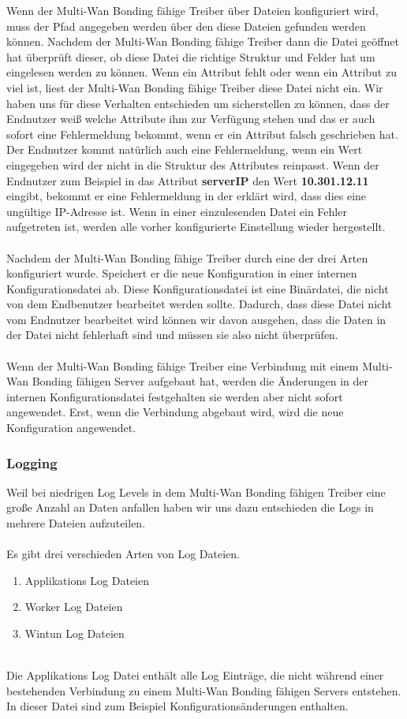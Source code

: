 Wenn der Multi-Wan Bonding fähige Treiber über Dateien konfiguriert wird, muss der Pfad angegeben werden über den diese Dateien gefunden werden können. Nachdem der Multi-Wan Bonding fähige Treiber dann die Datei geöffnet hat überprüft dieser, ob diese Datei die richtige Struktur und Felder hat um eingelesen werden zu können. Wenn ein Attribut fehlt oder wenn ein Attribut zu viel ist, liest der Multi-Wan Bonding fähige Treiber diese Datei nicht ein. Wir haben uns für diese Verhalten entschieden um sicherstellen zu können, dass der Endnutzer weiß welche Attribute ihm zur Verfügung stehen und das er auch sofort eine Fehlermeldung bekommt, wenn er ein Attribut falsch geschrieben hat. Der Endnutzer kommt natürlich auch eine Fehlermeldung, wenn ein Wert eingegeben wird der nicht in die Struktur des Attributes reinpasst. Wenn der Endnutzer zum Beispiel in das Attribut \textbf{serverIP} den Wert \textbf{10.301.12.11} eingibt, bekommt er eine Fehlermeldung in der erklärt wird, dass dies eine ungültige IP-Adresse ist. Wenn in einer einzulesenden Datei ein Fehler aufgetreten ist, werden alle vorher konfigurierte Einstellung wieder hergestellt. 
\\\\
Nachdem der Multi-Wan Bonding fähige Treiber durch eine der drei Arten konfiguriert wurde. Speichert er die neue Konfiguration in einer internen Konfigurationsdatei ab. Diese Konfigurationsdatei ist eine Binärdatei, die nicht von dem Endbenutzer bearbeitet werden sollte. Dadurch, dass diese Datei nicht vom Endnutzer bearbeitet wird können wir davon ausgehen, dass die Daten in der Datei nicht fehlerhaft sind und müssen sie also nicht   überprüfen.
\\\\
Wenn der Multi-Wan Bonding fähige Treiber eine Verbindung mit einem Multi-Wan Bonding fähigen Server aufgebaut hat, werden die Änderungen in der internen Konfigurationsdatei festgehalten sie werden aber nicht sofort angewendet. Erst, wenn die Verbindung abgebaut wird, wird die neue Konfiguration angewendet.
\subsubsection{Logging}
Weil bei niedrigen Log Levels in dem Multi-Wan Bonding fähigen Treiber eine große Anzahl an Daten anfallen haben wir uns dazu entschieden die Logs in mehrere Dateien aufzuteilen.
\\\\
Es gibt drei verschieden Arten von Log Dateien.
\\
\begin{enumerate}
    \item Applikations Log Dateien
    \item Worker Log Dateien
    \item Wintun Log Dateien
\end{enumerate}
\ \\
Die Applikations Log Datei enthält alle Log Einträge, die nicht während einer bestehenden Verbindung zu einem Multi-Wan Bonding fähigen Servers entstehen. In dieser Datei sind zum Beispiel Konfigurationsänderungen enthalten.

